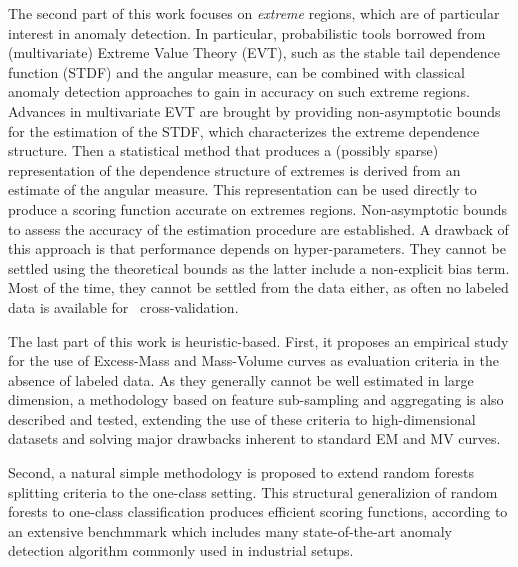 The second part of this work focuses on \emph{extreme} regions, which are of particular interest in anomaly detection. In particular, probabilistic tools borrowed from (multivariate) Extreme Value Theory (EVT), such as the stable tail dependence function (STDF) and the angular measure, can be combined with classical anomaly detection approaches to gain in accuracy on such extreme regions.
%
Advances in multivariate EVT are brought by providing non-asymptotic bounds for the estimation of the STDF, which characterizes the extreme dependence structure.
%
Then a statistical method that produces a (possibly sparse) representation of the dependence structure of extremes is derived from an estimate of the angular measure. This representation can be used directly to produce a scoring function accurate on extremes regions.
Non-asymptotic bounds to assess the accuracy of the estimation procedure are established.
A drawback of this approach is that performance depends on hyper-parameters. They cannot be settled using the theoretical bounds as the latter include a non-explicit bias term. Most of the time, they cannot be settled from the data either, as often no labeled data is available for \eg~cross-validation.


The last part of this work is heuristic-based. %
First, it proposes an empirical study for the use of Excess-Mass and Mass-Volume curves as evaluation criteria in the absence of labeled data.
As they generally cannot be well estimated in large dimension, a methodology based on feature sub-sampling and aggregating is also described and tested, extending the use of these criteria to high-dimensional datasets and solving major drawbacks inherent to standard EM and MV curves. 

Second, a natural simple methodology is proposed to extend random forests splitting criteria to the one-class setting.
This structural generalizion of random forests to one-class classification produces efficient scoring functions, according to an extensive benchmmark which includes many state-of-the-art anomaly detection algorithm commonly used in industrial setups.





